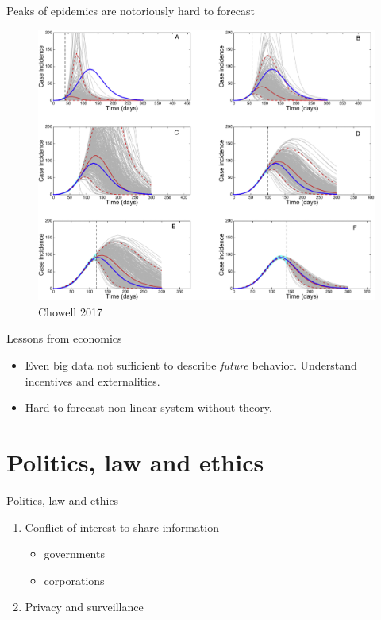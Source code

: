 \documentclass[
  ignorenonframetext,
  aspectratio=54,
]{beamer}
\providecommand{\tightlist}{%
  \setlength{\itemsep}{0pt}\setlength{\parskip}{0pt}}
\begin{document}
\begin{frame}{Peaks of epidemics are notoriously hard to forecast}
\protect\hypertarget{peaks-of-epidemics-are-notoriously-hard-to-forecast}{}
\begin{figure}
\centering
\includegraphics[width=\textwidth,height=0.8\textheight]{exhibit/fig/nonlinear.jpg}
\caption{Chowell 2017}
\end{figure}
\end{frame}

\begin{frame}{Lessons from economics}
\protect\hypertarget{lessons-from-economics}{}
\begin{itemize}
\tightlist
\item
  Even big data not sufficient to describe \emph{future} behavior.
  Understand incentives and externalities.
\item
  Hard to forecast non-linear system without theory.
\end{itemize}
\end{frame}

\hypertarget{politics-law-and-ethics}{%
\section{Politics, law and ethics}\label{politics-law-and-ethics}}

\begin{frame}{Politics, law and ethics}
\protect\hypertarget{politics-law-and-ethics-1}{}
\begin{enumerate}
\tightlist
\item
  Conflict of interest to share information

  \begin{itemize}
  \tightlist
  \item
    governments
  \item
    corporations
  \end{itemize}
\item
  Privacy and surveillance
\end{enumerate}
\end{frame}
\end{document}
